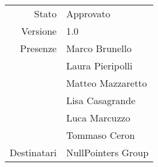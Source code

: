 \begin{center}
\begin{tabular}{r|l}
	Stato & Approvato \\
	Versione & 1.0 \\
	Presenze & Marco Brunello \\
	         & Laura Pieripolli \\
	         & Matteo Mazzaretto \\
	         & Lisa Casagrande \\
	         & Luca Marcuzzo \\
	         & Tommaso Ceron \\
	Destinatari & NullPointers Group \\
\end{tabular}
\end{center}